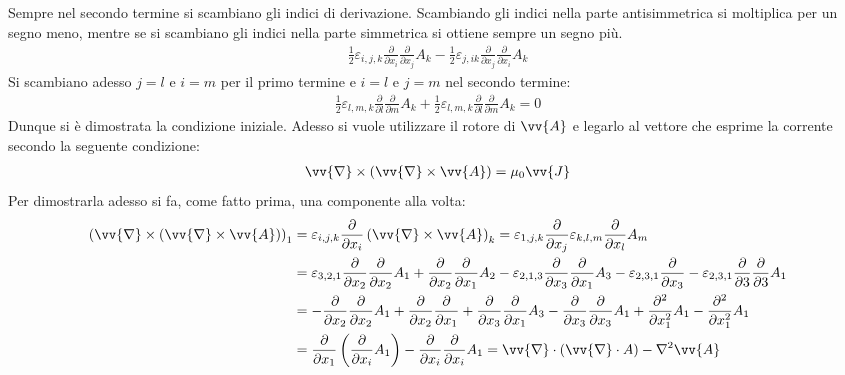 \documentclass[a4paper, oneside]{article}
\begin{document}
Sempre nel secondo termine si scambiano gli indici di derivazione. Scambiando gli indici 
nella parte antisimmetrica si moltiplica per un segno meno, mentre se si scambiano gli indici 
nella parte simmetrica si ottiene sempre un segno più.
\begin{gather*}
    \frac{1}{2} \varepsilon_{i,j, k} \frac{\partial }{\partial x_i} \frac{\partial }{\partial x_j}A_k  - \frac{1}{2} \varepsilon_{j, i k} \frac{\partial }{\partial x_j} \frac{\partial }{\partial x_i}A_k  
\end{gather*}
Si scambiano adesso $j = l$ e $i = m$ per il primo termine e $i =l $ e $j = m$ nel secondo termine:
\begin{gather*}
    \frac{1}{2} \varepsilon_{l, m, k} \frac{\partial }{\partial l}\frac{\partial }{\partial m} A_k + \frac{1}{2} \varepsilon_{l, m, k} \frac{\partial }{\partial l} \frac{\partial }{\partial m} A_k = 0    
\end{gather*}
Dunque si è dimostrata la condizione iniziale. Adesso si vuole utilizzare 
il rotore di $\vv{A}$ e legarlo al vettore che esprime la corrente 
secondo la seguente condizione:
\begin{align}
    \vv{\nabla} \times (\vv{\nabla} \times \vv{A}) = \mu_0 \vv{J}    
\end{align} 
Per dimostrarla adesso si fa, come fatto prima, una componente alla volta:
\begin{align*}
    \left(\vv{\nabla} \times (\vv{\nabla} \times \vv{A}  ) \right)_1 &= \varepsilon_{i, j, k} \frac{\partial }{\partial x_i} \left(\vv{\nabla} \times \vv{A}  \right)_k = \varepsilon_{1, j, k} \frac{\partial }{\partial x_j} \varepsilon_{k, l, m} \frac{\partial }{\partial x_l} A_m \\
    &= \varepsilon_{3, 2, 1} \frac{\partial }{\partial x_2} \frac{\partial }{\partial x_2} A_1 + \frac{\partial }{\partial x_2}       \frac{\partial }{\partial x_1} A_2 - \varepsilon_{2, 1 ,3} \frac{\partial }{\partial x_3}  \frac{\partial }{\partial x_1} A_3 - \varepsilon_{2,3,1 } \frac{\partial }{\partial x_3}  - \varepsilon_{2, 3, 1} \frac{\partial }{\partial 3} \frac{\partial }{\partial 3} A_1 \\
    &= -\frac{\partial }{\partial x_2} \frac{\partial }{\partial x_2} A_1 + \frac{\partial }{\partial x_2} \frac{\partial }{\partial x_1} + \frac{\partial }{\partial x_3} \frac{\partial }{\partial x_1} A_3 - \frac{\partial }{\partial x_3} \frac{\partial }{\partial x_3} A_1 + \frac{\partial ^{2}}{\partial x_1^{2}} A_1 - \frac{\partial ^{2}}{\partial x_1^{2}} A_1          \\
    &= \frac{\partial }{\partial x_1} \left(\frac{\partial }{\partial x_i}   A_1 \right) - \frac{\partial }{\partial x_i} \frac{\partial }{\partial x_i}A_1   = \vv{\nabla} \cdot  \left(\vv{\nabla} \cdot A \right) - \nabla^{2}\vv{A}  
\end{align*}
\end{document}
